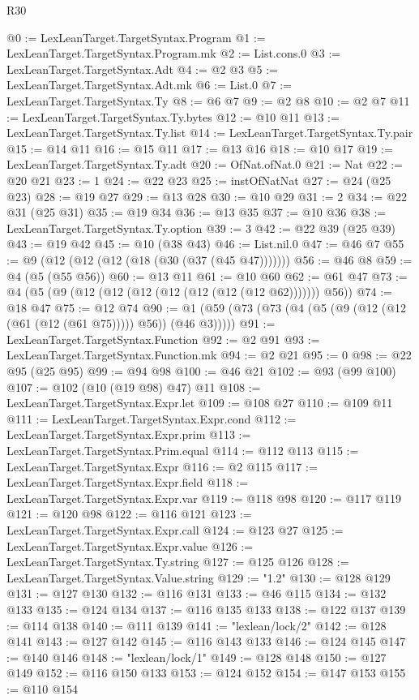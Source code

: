 \begin{lexlean}{R30}
\begin{coremodule}
@0 := LexLeanTarget.TargetSyntax.Program
@1 := LexLeanTarget.TargetSyntax.Program.mk
@2 := List.cons.{0}
@3 := LexLeanTarget.TargetSyntax.Adt
@4 := @2 @3
@5 := LexLeanTarget.TargetSyntax.Adt.mk
@6 := List.{0}
@7 := LexLeanTarget.TargetSyntax.Ty
@8 := @6 @7
@9 := @2 @8
@10 := @2 @7
@11 := LexLeanTarget.TargetSyntax.Ty.bytes
@12 := @10 @11
@13 := LexLeanTarget.TargetSyntax.Ty.list
@14 := LexLeanTarget.TargetSyntax.Ty.pair
@15 := @14 @11
@16 := @15 @11
@17 := @13 @16
@18 := @10 @17
@19 := LexLeanTarget.TargetSyntax.Ty.adt
@20 := OfNat.ofNat.{0}
@21 := Nat
@22 := @20 @21
@23 := 1
@24 := @22 @23
@25 := instOfNatNat
@27 := @24 (@25 @23)
@28 := @19 @27
@29 := @13 @28
@30 := @10 @29
@31 := 2
@34 := @22 @31 (@25 @31)
@35 := @19 @34
@36 := @13 @35
@37 := @10 @36
@38 := LexLeanTarget.TargetSyntax.Ty.option
@39 := 3
@42 := @22 @39 (@25 @39)
@43 := @19 @42
@45 := @10 (@38 @43)
@46 := List.nil.{0}
@47 := @46 @7
@55 := @9 (@12 (@12 (@12 (@18 (@30 (@37 (@45 @47)))))))
@56 := @46 @8
@59 := @4 (@5 (@55 @56))
@60 := @13 @11
@61 := @10 @60
@62 := @61 @47
@73 := @4 (@5 (@9 (@12 (@12 (@12 (@12 (@12 (@12 (@12 @62))))))) @56))
@74 := @18 @47
@75 := @12 @74
@90 := @1 (@59 (@73 (@73 (@4 (@5 (@9 (@12 (@12 (@61 (@12 (@61 @75))))) @56)) (@46 @3)))))
@91 := LexLeanTarget.TargetSyntax.Function
@92 := @2 @91
@93 := LexLeanTarget.TargetSyntax.Function.mk
@94 := @2 @21
@95 := 0
@98 := @22 @95 (@25 @95)
@99 := @94 @98
@100 := @46 @21
@102 := @93 (@99 @100)
@107 := @102 (@10 (@19 @98) @47) @11
@108 := LexLeanTarget.TargetSyntax.Expr.let
@109 := @108 @27
@110 := @109 @11
@111 := LexLeanTarget.TargetSyntax.Expr.cond
@112 := LexLeanTarget.TargetSyntax.Expr.prim
@113 := LexLeanTarget.TargetSyntax.Prim.equal
@114 := @112 @113
@115 := LexLeanTarget.TargetSyntax.Expr
@116 := @2 @115
@117 := LexLeanTarget.TargetSyntax.Expr.field
@118 := LexLeanTarget.TargetSyntax.Expr.var
@119 := @118 @98
@120 := @117 @119
@121 := @120 @98
@122 := @116 @121
@123 := LexLeanTarget.TargetSyntax.Expr.call
@124 := @123 @27
@125 := LexLeanTarget.TargetSyntax.Expr.value
@126 := LexLeanTarget.TargetSyntax.Ty.string
@127 := @125 @126
@128 := LexLeanTarget.TargetSyntax.Value.string
@129 := "1.2"
@130 := @128 @129
@131 := @127 @130
@132 := @116 @131
@133 := @46 @115
@134 := @132 @133
@135 := @124 @134
@137 := @116 @135 @133
@138 := @122 @137
@139 := @114 @138
@140 := @111 @139
@141 := "lexlean/lock/2"
@142 := @128 @141
@143 := @127 @142
@145 := @116 @143 @133
@146 := @124 @145
@147 := @140 @146
@148 := "lexlean/lock/1"
@149 := @128 @148
@150 := @127 @149
@152 := @116 @150 @133
@153 := @124 @152
@154 := @147 @153
@155 := @110 @154

\end{coremodule}
\end{lexlean}
